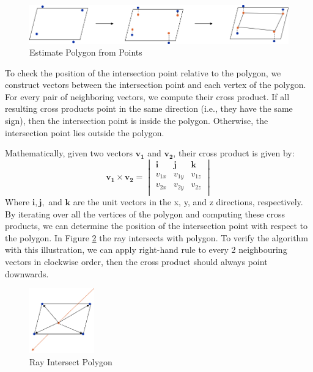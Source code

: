 \documentclass[11pt, a4paper,oneside,chapterprefix=false]{scrbook}
\begin{document}
\begin{figure}[H]
    \centering
    \includegraphics*[width=1.0\textwidth]{figures/detect openings.png}
    \caption{Estimate Polygon from Points}
    \label{fig:estimate polygon from points}
\end{figure}

To check the position of the intersection point relative to the polygon, we construct vectors between the intersection point and each vertex of the polygon. For every pair of neighboring vectors, we compute their cross product. If all resulting cross products point in the same direction (i.e., they have the same sign), then the intersection point is inside the polygon. Otherwise, the intersection point lies outside the polygon.

\vspace{10pt}

Mathematically, given two vectors \( \mathbf{v_1} \) and \( \mathbf{v_2} \), their cross product is given by:
\[
\mathbf{v_1} \times \mathbf{v_2} = \begin{vmatrix}
\mathbf{i} & \mathbf{j} & \mathbf{k} \\
v_{1x} & v_{1y} & v_{1z} \\
v_{2x} & v_{2y} & v_{2z} \\
\end{vmatrix}
\]
Where \( \mathbf{i}, \mathbf{j}, \) and \( \mathbf{k} \) are the unit vectors in the x, y, and z directions, respectively. By iterating over all the vertices of the polygon and computing these cross products, we can determine the position of the intersection point with respect to the polygon. In Figure \ref{fig:ray intersect polygon} the ray intersects with polygon. To verify the algorithm with this illustration, we can apply right-hand rule to every 2 neighbouring vectors in clockwise order, then the cross product should always point downwards.

\begin{figure}[H]
    \centering
    \includegraphics*[width=0.25\textwidth]{figures/intersect polygon.png}
    \caption{Ray Intersect Polygon}
    \label{fig:ray intersect polygon}
\end{figure}
\end{document}
